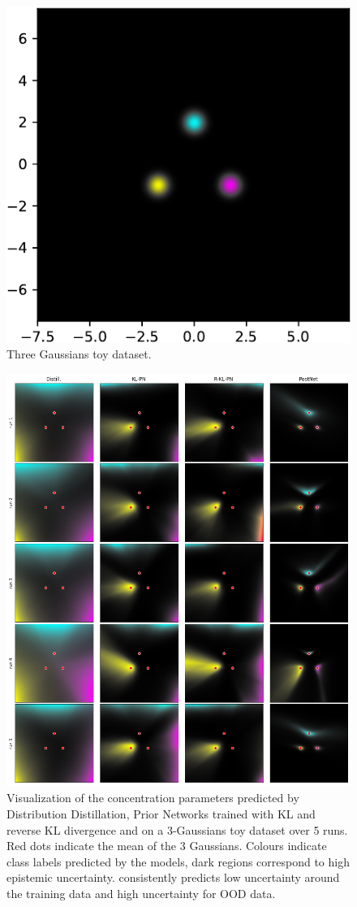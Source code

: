 \begin{figure}[ht]
    \centering
        \includegraphics[width= 0.25 \columnwidth]{sections/006_neurips2020/figures/three_gaussians_dataset-crop.pdf}
        
    \caption{Three Gaussians toy dataset.}
    \label{visualization_gaussians}
\end{figure}

\begin{figure}[ht]
    \centering
        \includegraphics[width=1. \textwidth]{sections/006_neurips2020/figures/visualization-grid.png}
        
    \caption{Visualization of the concentration parameters predicted by Distribution Distillation, Prior Networks trained with KL and reverse KL divergence and \ours on a 3-Gaussians toy dataset over 5 runs. Red dots indicate the mean of the 3 Gaussians. Colours indicate class labels predicted by the models, dark regions correspond to high epistemic uncertainty. \oursacro consistently predicts low uncertainty around the training data and high uncertainty for OOD data.}
    \label{fig:visualization_grid}
\end{figure}

